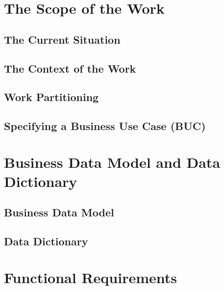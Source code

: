 \documentclass[12pt]{article}
\begin{document}
\section{The Scope of the Work}
  \subsection{The Current Situation}
  \subsection{The Context of the Work}
  \subsection{Work Partitioning}
  \subsection{Specifying a Business Use Case (BUC)}

\section{Business Data Model and Data Dictionary}
  \subsection{Business Data Model}
  \subsection{Data Dictionary}

\section{Functional Requirements}
\end{document}

